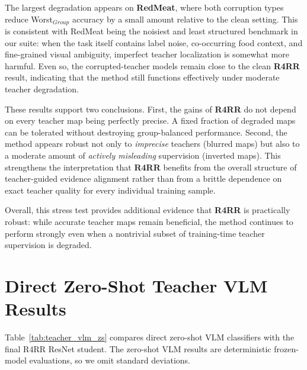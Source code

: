 \documentclass[10pt,twocolumn,letterpaper]{article}
\begin{document}
The largest degradation appears on \textbf{RedMeat}, where both corruption types reduce Worst$_{Group}$ accuracy by a small amount relative to the clean setting. This is consistent with RedMeat being the noisiest and least structured benchmark in our suite: when the task itself contains label noise, co-occurring food context, and fine-grained visual ambiguity, imperfect teacher localization is somewhat more harmful. Even so, the corrupted-teacher models remain close to the clean \textbf{R4RR} result, indicating that the method still functions effectively under moderate teacher degradation.

These results support two conclusions. First, the gains of \textbf{R4RR} do not depend on every teacher map being perfectly precise. A fixed fraction of degraded maps can be tolerated without destroying group-balanced performance. Second, the method appears robust not only to \emph{imprecise} teachers (blurred maps) but also to a moderate amount of \emph{actively misleading} supervision (inverted maps). This strengthens the interpretation that \textbf{R4RR} benefits from the overall structure of teacher-guided evidence alignment rather than from a brittle dependence on exact teacher quality for every individual training sample.

Overall, this stress test provides additional evidence that \textbf{R4RR} is practically robust: while accurate teacher maps remain beneficial, the method continues to perform strongly even when a nontrivial subset of training-time teacher supervision is degraded.




\section{Direct Zero-Shot Teacher VLM Results}
\label{appendix:teacher_zs}

Table~\ref{tab:teacher_vlm_zs} compares direct zero-shot VLM classifiers with the final R4RR ResNet student. The zero-shot VLM results are deterministic frozen-model evaluations, so we omit standard deviations.
\end{document}
